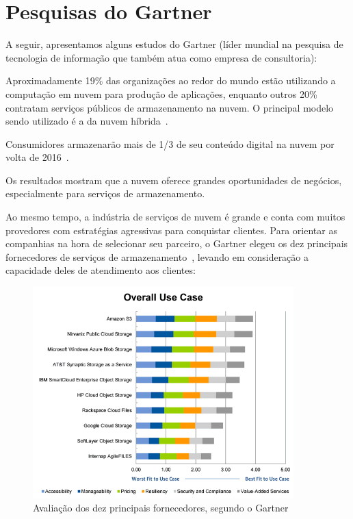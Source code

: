 \section{Pesquisas do Gartner}

A seguir, apresentamos alguns estudos do Gartner (líder mundial na
pesquisa de tecnologia de informação que também atua como empresa de consultoria):

\begin{itemise}

    \item Aproximadamente 19\% das organizações ao redor do mundo estão utilizando a
    computação em nuvem para produção de aplicações, enquanto outros 20\% contratam
    serviços públicos de armazenamento na nuvem. O principal modelo sendo utilizado é
    a da nuvem híbrida~\cite{gartner-public-cloud-services}.

    \item Consumidores armazenarão mais de 1/3 de seu conteúdo digital na nuvem por
    volta de 2016~\cite{gartner-one-third}.


\end{itemise}

Os resultados mostram que a nuvem oferece grandes oportunidades de negócios,
especialmente para serviços de armazenamento. 

Ao mesmo tempo, a indústria de serviços de nuvem é grande e conta com muitos 
provedores com estratégias agressivas para conquistar clientes. Para orientar as 
companhias na hora de selecionar seu parceiro, o Gartner elegeu os dez principais 
fornecedores de serviços de armazenamento~\cite{gartner-top-10}, levando em 
consideração a capacidade deles de atendimento aos clientes:

\begin{figure}[ht]
    \centering
    \includegraphics[width=0.9\textwidth]{img/top10.png}
    \caption{Avaliação dos dez principais fornecedores, segundo o Gartner}
\end{figure}
